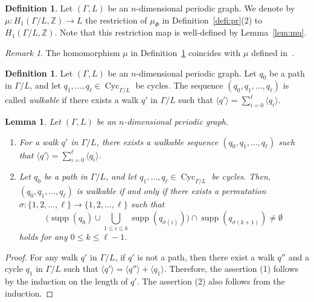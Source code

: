 \documentclass[10pt,a4paper]{amsart}
\theoremstyle{plain}
\newtheorem{lem}[cdrthm]{Lemma}
\theoremstyle{definition}
\newtheorem{defi}[cdrthm]{Definition}
\theoremstyle{remark}
\newtheorem{rmk}[cdrthm]{Remark}
\begin{document}
\begin{defi}\label{defi:mu}
Let $(\Gamma, L)$ be an $n$-dimensional periodic graph. 
We denote by $\mu \colon H_1(\Gamma/L, \mathbb{Z}) \to L$ the restriction of 
$\mu _{\Phi}$ in Definition~\ref{defi:pr}(2) to $H_1(\Gamma/L, \mathbb{Z})$. 
Note that this restriction map is well-defined by Lemma~\ref{lem:mu}. 
\end{defi}

\begin{rmk}\label{rmk:mu}
The homomorphism $\mu$ in Definition~\ref{defi:mu} coincides with $\mu$ defined in~\cite[Section 6.1]{Sunada}. 
\end{rmk}

\setcounter{cdrthm}{10}
\begin{defi}
Let $(\Gamma, L)$ be an $n$-dimensional periodic graph. 
Let $q_0$ be a path in $\Gamma /L$, and let $q_1, \ldots, q_{\ell} \in \operatorname{Cyc}_{\Gamma /L}$ be cycles. 
The sequence $(q_0, q_1, \ldots, q_{\ell})$ is called \textit{walkable} 
if there exists a walk $q'$ in $\Gamma / L$ such that 
$\langle q' \rangle = \sum _{i = 0} ^{\ell} \langle q_i \rangle$. 
\end{defi}

\begin{lem}\label{lem:bunkai}
Let $(\Gamma, L)$ be an $n$-dimensional periodic graph. 
\begin{enumerate}
\item 
For a walk $q'$ in $\Gamma / L$, there exists a walkable sequence $(q_0, q_1, \ldots , q_{\ell})$ such that 
$\langle q' \rangle = \sum _{i = 0} ^{\ell} \langle q_i \rangle$. 

\item 
Let $q_0$ be a path in $\Gamma /L$, and let $q_1, \ldots, q_{\ell} \in \operatorname{Cyc}_{\Gamma /L}$ be cycles. 
Then, $(q_0, q_1, \ldots, q_{\ell})$ is walkable if and only if 
there exists a permutation $\sigma:  \{ 1,2, \ldots, \ell \} \to \{ 1,2, \ldots, \ell \}$ such that
\[
\biggl( \operatorname{supp}(q_0) \cup \bigcup _{1 \le i \le k} \operatorname{supp}(q_{\sigma(i)}) \biggr) 
\cap \operatorname{supp}(q_{\sigma(k+1)}) \not = \emptyset
\] 
holds for any $0 \le k \le \ell -1$.

\end{enumerate}
\end{lem}
\begin{proof}
For any walk $q'$ in $\Gamma /L$, 
if $q'$ is not a path, then 
there exist a walk $q''$ and a cycle $q_1$ in $\Gamma /L$ 
such that $\langle q' \rangle = \langle q'' \rangle + \langle q_1 \rangle$. 
Therefore, the assertion (1) follows by the induction on the length of $q'$. 
The assertion (2) also follows from the induction. 
\end{proof}
\end{document}
